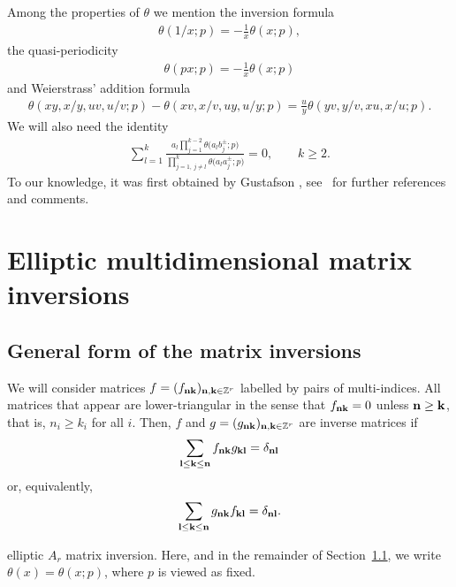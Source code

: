 \documentclass[11pt]{article}
\numberwithin{equation}{section}
\def\ta{\theta}
\begin{document}
Among the properties of $\theta$ we mention the inversion formula
\begin{gather}
\label{ti}\theta(1/x;p)=-\frac1 x \theta(x;p),
\end{gather}
the quasi-periodicity
\begin{gather}
\label{qpt}\ta(px;p)=-\frac1 x \theta(x;p)
\end{gather}
and Weierstrass' addition formula
\begin{gather}\label{tadd}
\ta(xy,x/y,uv,u/v;p)-\ta(xv,x/v,uy,u/y;p)=\frac uy \ta(yv,y/v,xu,x/u;p).
\end{gather}
We will also need the identity
\begin{gather}\label{cpf}
\sum_{l=1}^k\frac{a_l\prod\limits_{j=1}^{k-2}\theta\big(a_lb_j^\pm;p\big)}
{\prod\limits_{j=1,\,j\neq l}^k\theta\big(a_la_j^\pm;p\big)}=0, \qquad
k\geq 2.
\end{gather}
To our knowledge, it was first obtained by Gustafson
\cite[Lemma~4.14]{gu}, see~\cite{r} for further references and comments.

\setcounter{section}{2}
\setcounter{subsection}{2}
\setcounter{subsubsection}{0}
\setcounter{Theorem}{2}
\setcounter{equation}{6}
\section{Elliptic multidimensional matrix inversions}\label{mis}


\subsection{General form of the matrix inversions}
\label{gmis}


We will consider matrices
 $f=(f_{\bf nk})_{{\bf n}, {\bf k}\in\mathbb Z^r}$
labelled by pairs of multi-indices. All matrices that appear are
lower-triangular in the sense that $f_{\bf nk}=0$ unless $\bf
n\geq\bf k$, that is, $n_i\geq k_i$ for all $i$. Then,
$f$ and $g=(g_{\bf nk})_{{\bf n}, {\bf k}\in\mathbb Z^r}$
are inverse matrices if
\begin{gather}\label{fg}
\sum_{\bf l\leq k\leq n}f_{\bf nk}g_{\bf kl}=\delta_{\bf nl} \end{gather}
or, equivalently,
\begin{gather*}
\sum_{\bf l\leq k\leq n}g_{\bf nk}f_{\bf kl}=\delta_{\bf nl}.
\end{gather*}

\setcounter{section}{3}
\setcounter{subsection}{1}
\setcounter{subsubsection}{0}
\setcounter{Theorem}{0}
\setcounter{equation}{1}
 elliptic $A_r$ matrix inversion. Here, and in the remainder of Section~\ref{gmis}, we write
 $\theta(x)=\theta(x;p)$, where $p$ is viewed as fixed.
\end{document}
